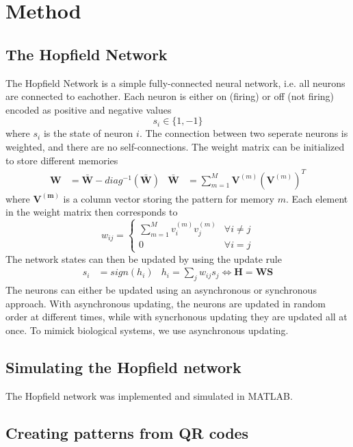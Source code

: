 \section{Method}

\subsection{The Hopfield Network}
The Hopfield Network is a simple fully-connected neural network, i.e. all neurons are connected to eachother. Each neuron is either on (firing) or off (not firing) encoded as positive and negative values
$$s_i \in \{1, -1\}$$ where $s_i$ is the state of neuron $i$.
The connection between two seperate neurons is weighted, and there are no self-connections. The weight matrix can be initialized to store different memories 
\begin{align}
    \mathbf{W} &= {\bar{\mathbf{W}}} - diag^{-1}(\bar{\mathbf{W}}) & \bar{\mathbf{W}} &= \sum_{m=1}^M \mathbf{V}^{(m)} (\mathbf{V}^{(m)})^T 
\end{align} where $\mathbf{V^{(m)}}$ is a column vector storing the pattern for memory $m$.
Each element in the weight matrix then corresponds to
\begin{equation}
    w_{ij} = \begin{cases}
        \sum_{m=1}^M v_{i}^{(m)} v_{j}^{(m)} & \forall i \neq j \\
        0 & \forall i = j
    \end{cases}
\end{equation}
The network states can then be updated by using the update rule
\begin{align}
    s_i &= sign(h_i) & h_i = \sum_{j} w_{ij} s_j \iff \mathbf{H} = \mathbf{W} \mathbf{S}
\end{align}
The neurons can either be updated using an asynchronous or synchronous approach. With asynchronous updating, the neurons are updated in random order at different times, while with syncrhonous updating they are updated all at once. To mimick biological systems, we use asynchronous updating.

\subsection{Simulating the Hopfield network}
The Hopfield network was implemented and simulated in MATLAB.

\subsection{Creating patterns from QR codes}



